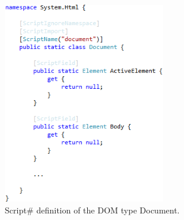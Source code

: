 		\begin{figure}[H]
				\includegraphics[width=7cm]{resources/images/Document.png}
			\caption{Script\# definition of the DOM type Document.}
			\label{fig:document}
		\end{figure}

